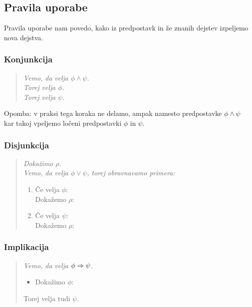 \subsection{Pravila uporabe}

Pravila uporabe nam povedo, kako iz predpostavk in že znanih dejstev izpeljemo nova dejstva.

\subsubsection{Konjunkcija} 

\begin{quote}
  \sl
  Vemo, da velja $\phi \land \psi$.\\
  Torej velja $\phi$.\\
  Torej velja $\psi$.
\end{quote}
%
Opomba: v praksi tega koraka ne delamo, ampak namesto predpostavke $\phi \land \psi$ kar takoj vpeljemo ločeni
predpostavki $\phi$ in $\psi$.


\subsubsection{Disjunkcija}
%
\begin{quote}
  \sl
  Dokažimo $\rho$.\\
  Vemo, da velja $\phi \lor \psi$, torej obravnavamo primera:\\
  \begin{enumerate}
  \item Če velja $\phi$: \\
        Dokažemo $\rho$: \quad {}
  \item Če velja $\psi$: \\
        Dokažemo $\rho$: \quad {}
  \end{enumerate}
\end{quote}

\subsubsection{Implikacija}

\begin{quote}
  \sl
  Vemo, da velja $\phi \Rightarrow \psi$.
  \begin{itemize}
  \item[] Dokažimo $\phi$: \quad {}
  \end{itemize}
  Torej velja tudi $\psi$.
\end{quote}


